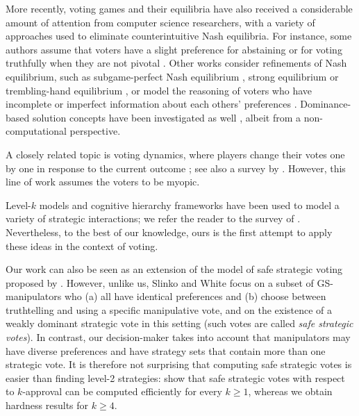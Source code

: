 \documentclass[11pt]{article}
\begin{document}
More recently, voting games and their equilibria have also received 
a considerable amount of attention from computer science researchers, with
a variety of approaches used to eliminate counterintuitive Nash equilibria.
For instance, some authors assume that voters have a slight preference for abstaining
or for voting truthfully when they are not pivotal
\citep{bat:j:abstentions,dut-sen:j:nash,des-elk:c:eq,tho-lev-ley:c:empirical,obr-mar-tho:c:truth-biased,emos15,OLMRR15}.
Other works consider refinements of Nash equilibrium, such as subgame-perfect Nash equilibrium 
\citep{des-elk:c:eq,xia-con:c:spne}, strong equilibrium \citep{mes-pol:j:strong} 
or trembling-hand equilibrium \citep{OREPJ16},
or model the reasoning of voters who have incomplete or imperfect information about each others'
preferences \citep{mye-web:j:voting,Myatt2007,MLR14}.
Dominance-based solution concepts have been investigated as well 
\citep{mou:j:dominance,dhi-loc:j:dominance,bue-dhi-vid:j:domsolv,dellis2010weak,MLR14}, 
albeit from a non-computational perspective.
  
A closely related topic is voting dynamics, where players change their votes one by one in response to the current outcome
\citep{mei-pol:c:convergence,rei-end:c:polls,rey-wil:c:bestreply,OMPRJ15,EOPR16,lev-ros:j:iterative,KSLR17}; 
see also a survey by \citet{Meir-trends}.  
However, this line of work assumes the voters to be myopic.

Level-$k$ models and cognitive hierarchy frameworks have been used to model a variety of strategic interactions;
we refer the reader to the survey of \citet{crawford2013structural}. Nevertheless, to the best
of our knowledge, ours is the first attempt to apply these ideas in the context of voting.

Our work can also be seen as an extension of the model of safe strategic voting proposed by \citet{safe2}. 
However, unlike us, Slinko
and White focus on a subset of GS-manipulators who (a) all have identical preferences
and (b) choose between truthtelling and using a specific manipulative vote,  
and on the existence of a weakly dominant strategic vote in this setting
(such votes are called {\em safe strategic votes}). In contrast, our decision-maker takes into account that
manipulators may have diverse preferences and have strategy sets that contain more than one strategic vote.
It is therefore not surprising that computing safe strategic votes is easier than finding level-2 strategies:
\citet{safe-sagt} show that safe strategic votes with respect to $k$-approval can be computed efficiently
for every $k\ge 1$, whereas we obtain hardness results for $k\ge 4$. 
\end{document}
